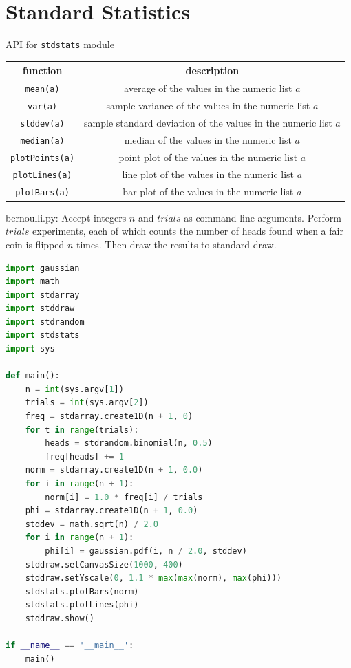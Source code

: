 \documentclass[8pt,a4paper,compress]{beamer}
\begin{document}
\section{Standard Statistics}
\begin{frame}[fragile]
\pause

API for \lstinline{stdstats} module
\begin{center}
\begin{tabular}{cc}
function & description \\ \hline
\lstinline$mean(a)$ & average of the values in the numeric list $a$ \\
\lstinline$var(a)$ & sample variance of the values in the numeric list $a$ \\
\lstinline$stddev(a)$ & sample standard deviation of the values in the numeric list $a$ \\
\lstinline$median(a)$ & median of the values in the numeric list $a$ \\
\lstinline$plotPoints(a)$ & point plot of the values in the numeric list $a$ \\
\lstinline$plotLines(a)$ & line plot of the values in the numeric list $a$ \\
\lstinline$plotBars(a)$ & bar plot of the values in the numeric list $a$
\end{tabular} 
\end{center}
\end{frame}

\begin{frame}[fragile]
\pause

\begin{framed}
\tiny bernoulli.py: Accept integers $n$ and $trials$ as command-line arguments. Perform $trials$ experiments, each of which counts the number of heads found when a fair coin is flipped $n$ times. Then draw the results to standard draw. 
\end{framed}

\begin{lstlisting}[language=Python,style=focusin]
import gaussian
import math
import stdarray
import stddraw
import stdrandom
import stdstats
import sys

def main():
    n = int(sys.argv[1])
    trials = int(sys.argv[2])
    freq = stdarray.create1D(n + 1, 0)
    for t in range(trials):
        heads = stdrandom.binomial(n, 0.5)
        freq[heads] += 1
    norm = stdarray.create1D(n + 1, 0.0)
    for i in range(n + 1):
        norm[i] = 1.0 * freq[i] / trials
    phi = stdarray.create1D(n + 1, 0.0)
    stddev = math.sqrt(n) / 2.0
    for i in range(n + 1):
        phi[i] = gaussian.pdf(i, n / 2.0, stddev)
    stddraw.setCanvasSize(1000, 400)
    stddraw.setYscale(0, 1.1 * max(max(norm), max(phi)))
    stdstats.plotBars(norm)
    stdstats.plotLines(phi)
    stddraw.show()

if __name__ == '__main__':
    main()
\end{lstlisting}
\end{frame}
\end{document}
